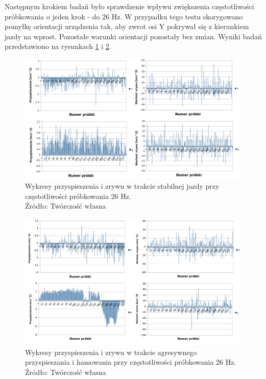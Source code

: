 Następnym krokiem badań było sprawdzenie wpływu zwiększenia częstotliwości próbkowania o jeden krok - do 26 Hz. W przypadku tego testu skorygowano pomyłkę orientacji urządzenia tak, aby zwrot osi Y pokrywał się z kierunkiem jazdy na wprost. Pozostałe warunki orientacji pozostały bez zmian. Wyniki badań przedstawiono na rysunkach \ref{fig:image_driving_analysis_test_26Hz} i \ref{fig:image_driving_analysis_test_acc_26Hz}.

\begin{figure}[H]
	\centering
	\includegraphics[width=18cm]{img/driving_analysis/stabilna_26.png}
	\caption{Wykresy przyspieszenia i zrywu w trakcie stabilnej jazdy przy częstotliwości próbkowania 26 Hz.
	\\Źródło: Twórczość własna}
	\label{fig:image_driving_analysis_test_26Hz}
\end{figure}

\begin{figure}[H]
	\centering
	\includegraphics[width=18cm]{img/driving_analysis/Ostre_przyspieszenie_26Hz.png}
	\caption{Wykresy przyspieszenia i zrywu w trakcie agresywnego przyspieszania i hamowania przy częstotliwości próbkowania 26 Hz.
	\\Źródło: Twórczość własna}
	\label{fig:image_driving_analysis_test_acc_26Hz}
\end{figure}

